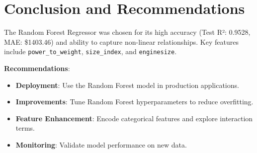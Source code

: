 \documentclass[12pt]{article}
\begin{document}
\section{Conclusion and Recommendations}
The Random Forest Regressor was chosen for its high accuracy (Test R²: 0.9528, MAE: \$1403.46) and ability to capture non-linear relationships. Key features include \texttt{power\_to\_weight}, \texttt{size\_index}, and \texttt{enginesize}.

\textbf{Recommendations}:
\begin{itemize}
    \item \textbf{Deployment}: Use the Random Forest model in production applications.
    \item \textbf{Improvements}: Tune Random Forest hyperparameters to reduce overfitting.
    \item \textbf{Feature Enhancement}: Encode categorical features and explore interaction terms.
    \item \textbf{Monitoring}: Validate model performance on new data.
\end{itemize}
\end{document}
